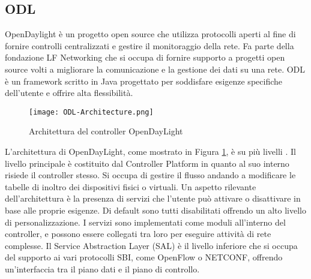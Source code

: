 \subsection{ODL}
OpenDaylight\cite{ODL} è un progetto open source che utilizza protocolli aperti al fine di fornire controlli centralizzati e gestire il monitoraggio della rete.
\newline Fa parte della fondazione LF Networking \cite{LFN} che si occupa di fornire supporto a progetti open source volti a migliorare la comunicazione e la gestione dei dati su una rete.
\newline ODL è un framework scritto in Java progettato per soddisfare esigenze specifiche dell'utente e offrire alta flessibilità. 
\begin{figure}[h]
    \centering
   \texttt{[image: ODL-Architecture.png]}
    \caption{Architettura del controller OpenDayLight \cite{archodl}}
    \label{fig:ArchODL}
\end{figure}
\newline L'architettura di OpenDayLight, come mostrato in Figura \ref{fig:ArchODL}, è su più livelli \cite{tesiodl}. 
Il livello principale è costituito dal Controller Platform in quanto al suo interno risiede il controller stesso. Si 
occupa di gestire il flusso andando a modificare le tabelle di inoltro dei dispositivi fisici o virtuali. 
\newline Un aspetto rilevante dell'architettura è la presenza di servizi che l'utente può attivare o disattivare in base alle proprie esigenze.
Di default sono tutti disabilitati offrendo un alto livello di personalizzazione.
\newline I servizi sono implementati come moduli all'interno del controller, e possono essere collegati tra loro per eseguire attività di rete complesse. 
\newline Il Service Abstraction Layer (SAL) è il livello inferiore che si occupa del supporto ai vari protocolli SBI, come OpenFlow o NETCONF, offrendo un'interfaccia tra il piano dati e il piano di controllo. 
